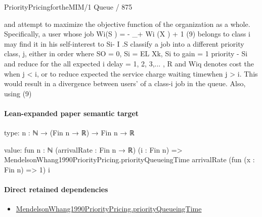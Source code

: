 \documentclass[10pt]{article}
\begin{document}
\begin{ReviewVerbatim}
                                                                                  PriorityPricingfortheMIM/1 Queue / 875

and                                                                   attempt to maximize the objective function of the
                                                                      organization as a whole. Specifically, a user whose job
 Wi(S ) = - _+ Wi (X ) + 1 (9)                                        belongs to class i may find it in his self-interest to
           Si- I .S
                                                                       classify a job into a different priority class, j, either in
                         order
 where SO = 0, Si = EL Xk,  Si to gain
                                  = 1  priority
                                           - Si and reduce
                                                     for   the all
                                                               expected
                                                                     i delay
                                                                        = 1,
2, 3,... , R and Wiq denotes cost
                              the   when  j < i, or to reduce
                                       expected               the service charge
                                                            waiting          timewhen
                             j > i. This would result in a divergence between users'
of a class-i job in the queue. Also, using (9)
\end{ReviewVerbatim}



\paragraph{Lean-expanded paper semantic target}
\begin{ReviewVerbatim}
type:
{n : ℕ} → (Fin n → ℝ) → Fin n → ℝ

value:
fun {n : ℕ} (arrivalRate : Fin n → ℝ) (i : Fin n) =>
  MendelsonWhang1990PriorityPricing.priorityQueueingTime arrivalRate (fun (x : Fin n) => 1) i
\end{ReviewVerbatim}

\paragraph{Direct retained dependencies}
\begin{itemize}\raggedright
\item \hyperlink{paper-prerequisite-49957d909aa24bc5}{Mendelson\allowbreak{}Whang1990\allowbreak{}Priority\allowbreak{}Pricing.\allowbreak{}priority\allowbreak{}Queueing\allowbreak{}Time}
\end{itemize}
\end{document}
